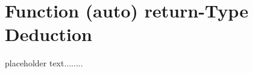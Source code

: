 \newpage
{}
\section[Deduced Return Type]{Function ({\SecCode auto}) {\SecCode return}-Type Deduction}\label{Function-Return-Type-Deduction}



placeholder text........


